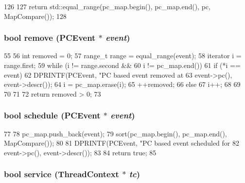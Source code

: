 \begin{DoxyCode}
126 {
127     return std::equal_range(pc_map.begin(), pc_map.end(), pc, MapCompare());
128 }
\end{DoxyCode}
\hypertarget{classPCEventQueue_a4a7ef09b8011f061e6d6624ed1de21b4}{
\subsubsection[{remove}]{\setlength{\rightskip}{0pt plus 5cm}bool remove ({\bf PCEvent} $\ast$ {\em event})}}
\label{classPCEventQueue_a4a7ef09b8011f061e6d6624ed1de21b4}



\begin{DoxyCode}
55 {
56     int removed = 0;
57     range_t range = equal_range(event);
58     iterator i = range.first;
59     while (i != range.second &&
60            i != pc_map.end()) {
61         if (*i == event) {
62             DPRINTF(PCEvent, "PC based event removed at %
63                     event->pc(), event->descr());
64             i = pc_map.erase(i);
65             ++removed;
66         } else {
67             i++;
68         }
69 
70     }
71 
72     return removed > 0;
73 }
\end{DoxyCode}
\hypertarget{classPCEventQueue_a3f0bfe2be12ac8f8e0ab5b1ad9633b8b}{
\subsubsection[{schedule}]{\setlength{\rightskip}{0pt plus 5cm}bool schedule ({\bf PCEvent} $\ast$ {\em event})}}
\label{classPCEventQueue_a3f0bfe2be12ac8f8e0ab5b1ad9633b8b}



\begin{DoxyCode}
77 {
78     pc_map.push_back(event);
79     sort(pc_map.begin(), pc_map.end(), MapCompare());
80 
81     DPRINTF(PCEvent, "PC based event scheduled for %
82             event->pc(), event->descr());
83 
84     return true;
85 }
\end{DoxyCode}
\hypertarget{classPCEventQueue_a8060d68f4bd9328c674f6838dbb57494}{
\subsubsection[{service}]{\setlength{\rightskip}{0pt plus 5cm}bool service ({\bf ThreadContext} $\ast$ {\em tc})}}
\label{classPCEventQueue_a8060d68f4bd9328c674f6838dbb57494}



